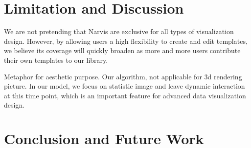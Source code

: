 \section{Limitation and Discussion}
We are not pretending that Narvis are exclusive for all types of visualization design. However, by allowing users a high flexibility to create and edit templates, we believe its coverage  will quickly broaden as more and more users contribute their own templates to our library. \par
Metaphor for aesthetic purpose.
Our algorithm, not applicable for 3d rendering picture. 
In our model, we focus on statistic image and leave dynamic interaction at this time point, which is an important feature for advanced data visualization design. 
\section{Conclusion and Future Work}
